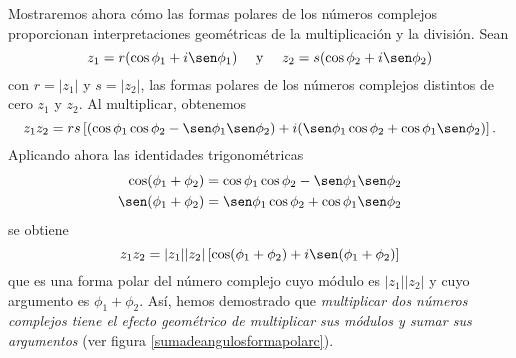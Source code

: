 Mostraremos ahora cómo las formas polares de los números complejos proporcionan interpretaciones geométricas de la multiplicación y la división. Sean
$$z_1 = r (\cos \phi_1 + i \sen \phi_1) \quad \text{ y } \quad z_2 = s (\cos \phi_2 + i \sen \phi_2)$$
con $r = |z_1|$ y $s = |z_2|$, las formas polares de los números complejos distintos de cero $z_1$ y $z_2$. Al multiplicar, obtenemos
$$z_1 z_2 = rs \left[ (\cos \phi_1 \cos \phi_2 - \sen \phi_1 \sen \phi_2) + i(\sen \phi_1 \cos \phi_2 + \cos \phi_1 \sen \phi_2) \right].$$
Aplicando ahora las identidades trigonométricas
\begin{align*}
    \cos(\phi_1 + \phi_2) & = \cos \phi_1 \cos \phi_2 - \sen \phi_1 \sen \phi_2 \\
    \sen(\phi_1 + \phi_2) & = \sen \phi_1 \cos \phi_2 + \cos \phi_1 \sen \phi_2
\end{align*}
se obtiene
\begin{equation}
    z_1 z_2 = |z_1||z_2| \left[ \cos(\phi_1 + \phi_2) + i \sen(\phi_1 + \phi_2) \right] \label{prodcomplejopolar}
\end{equation}
que es una forma polar del número complejo cuyo módulo es $|z_1||z_2|$ y cuyo argumento es $\phi_1 + \phi_2$. Así, hemos demostrado que \emph{multiplicar dos números complejos tiene el efecto geométrico de multiplicar sus módulos y sumar sus argumentos} (ver figura \ref{sumadeangulosformapolarc}).

